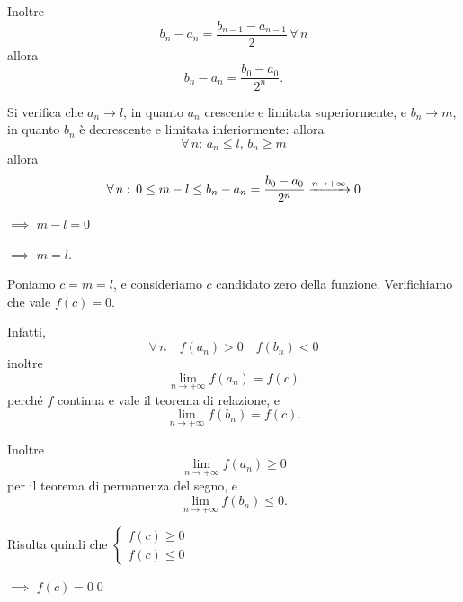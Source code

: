 {\begin{itemize}
        Inoltre \[
            b_{n}-a_{n}=\frac{b_{n-1}-a_{n-1}}{2}\, \forall\,n
        \] allora \[
            b_{n}-a_{n}= \frac{b_0-a_0}{2^{n}}.
        \]

        Si verifica che $ a_{n} \longrightarrow l $, in quanto $ a_{n} $ crescente e limitata superiormente, e $ b_{n} \longrightarrow m $, in quanto $ b_{n} $ è decrescente e limitata inferiormente: allora \[
            \forall\,n:\, a_{n}\le l,\,b_{n}\ge m  
        \] allora \[
            \forall\, n:\, 0\le m-l\le b_{n}-a_{n}=\frac{b_0-a_0}{2^{n}} \xrightarrow{n\to +\infty} 0 \displaystyle  
        \] 
        
        $\implies$ $ m-l=0 $ 
        
        $\implies$ $ m=l $.

        Poniamo $ c=m=l $, e consideriamo $ c $ candidato zero della funzione. Verifichiamo che vale $ f(c)=0 $.

        Infatti,\[
            \forall\,n\quad f(a_{n}) >0\quad f(b_{n} )<0
        \]
        inoltre \[
            \lim_{n\to +\infty} f(a_{n} ) = f(c)
        \]
        perché $ f $ continua e vale il teorema di relazione, e \[
            \lim_{n\to +\infty} f(b_{n} ) = f(c).
        \]
        
        Inoltre \[
            \lim_{n\to +\infty} f(a_{n} ) \ge 0
        \]
        per il teorema di permanenza del segno, e 
        \[
            \lim_{n\to +\infty} f(b_{n} ) \le 0.
        \]

        Risulta quindi che $ \begin{cases}
            f(c)\ge 0 \\
            f(c)\le 0
        \end{cases} $ 
        
        $\implies$ $ f(c)=0 $\qed
    \end{itemize}
}



